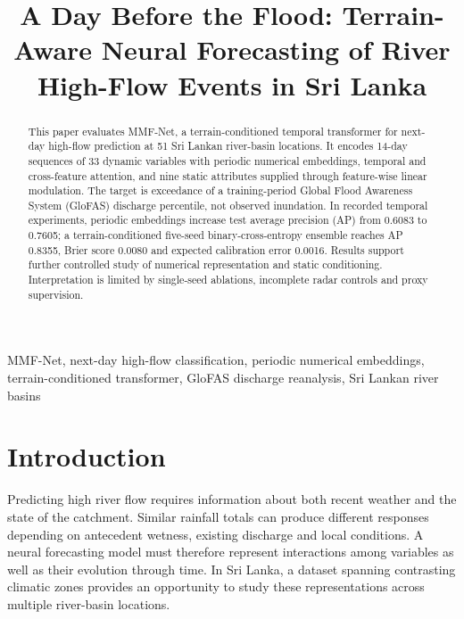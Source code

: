 \documentclass[conference]{IEEEtran}
\begin{document}
\title{A Day Before the Flood: Terrain-Aware Neural Forecasting of River High-Flow Events in Sri Lanka}
\author{%
}
\maketitle

\begin{abstract}
This paper evaluates MMF-Net, a terrain-conditioned temporal transformer for
next-day high-flow prediction at 51 Sri Lankan river-basin locations. It encodes
14-day sequences of 33 dynamic variables with periodic numerical embeddings,
temporal and cross-feature attention, and nine static attributes supplied
through feature-wise linear modulation. The target is exceedance of a
training-period Global Flood Awareness System (GloFAS) discharge percentile,
not observed inundation. In recorded temporal experiments, periodic embeddings
increase test average precision (AP) from 0.6083 to 0.7605; a terrain-conditioned
five-seed binary-cross-entropy ensemble reaches AP 0.8355, Brier score 0.0080
and expected calibration error 0.0016. Results support further controlled study
of numerical representation and static conditioning. Interpretation is limited
by single-seed ablations, incomplete radar controls and proxy supervision.
\end{abstract}
\begin{IEEEkeywords}
MMF-Net, next-day high-flow classification, periodic numerical embeddings,
terrain-conditioned transformer, GloFAS discharge reanalysis, Sri Lankan river basins
\end{IEEEkeywords}

\section{Introduction}
Predicting high river flow requires information about both recent weather and
the state of the catchment. Similar rainfall totals can produce different
responses depending on antecedent wetness, existing discharge and local
conditions. A neural forecasting model must therefore represent interactions
among variables as well as their evolution through time. In Sri Lanka, a
dataset spanning contrasting climatic zones provides an opportunity to study
these representations across multiple river-basin locations.
\end{document}
